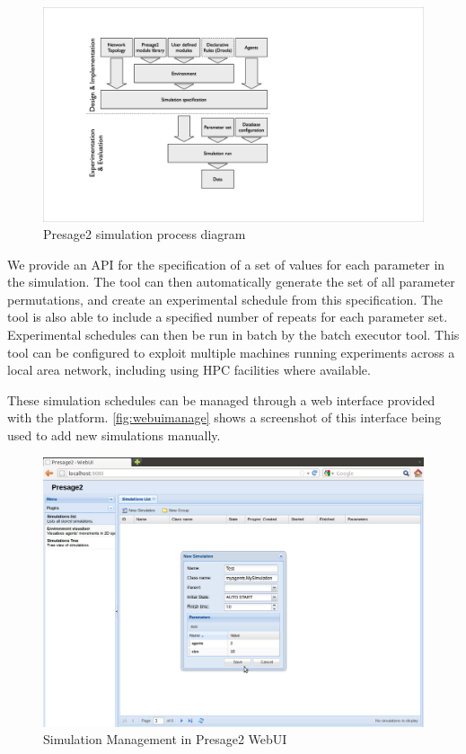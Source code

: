 \begin{figure}
\centering
\caption{Presage2 simulation process diagram}\label{fig:presage2process}
\includegraphics[width=0.8\linewidth]{gfx/presage2/simulation_process}
\end{figure}

We provide an \ac{API} for the specification of a set of values for each
parameter in the simulation. The tool can then automatically generate the set
of all parameter permutations, and create an experimental schedule from this
specification. The tool is also able to include a specified number of repeats
for each parameter set. Experimental schedules can then be run in batch by the
batch executor tool. This tool can be configured to exploit multiple machines
running experiments across a local area network, including using \ac{HPC}
facilities where available.

These simulation schedules can be managed through a web interface provided with
the platform. \autoref{fig:webuimanage} shows a screenshot of this interface
being used to add new simulations manually.

\begin{figure}
\caption{Simulation Management in Presage2 WebUI}\label{fig:webuimanage}
\includegraphics[width=\linewidth]{gfx/presage2/webui_manage}
\end{figure}

